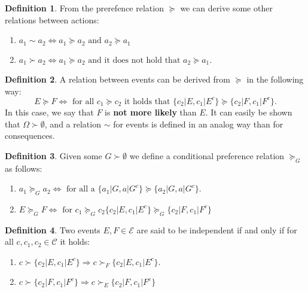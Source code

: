\documentclass[english,letterpaper,12pt,final]{article}
\theoremstyle{definition}
\newtheorem{defi}{Definition}[section]
\begin{document}
	\begin{defi}
	From the prerefence relation $\succeq$ we can derive some other relations between actions:
	\begin{enumerate}[label=(\roman*)]
	\item $a_1 \sim a_2 \Leftrightarrow a_1 \succeq a_2 \textrm{ and } a_2 \succeq a_1$
	\item $a_1 \succ a_2 \Leftrightarrow a_1 \succeq a_2 \textrm{ and it does not hold that } a_2 \succeq a_1$.
	\end{enumerate}
	\end{defi}
	\begin{defi}{\label{more_likely}}
	A relation between events can be derived from $\succeq$ in the following way:
	\[E \succeq F \Leftrightarrow \textrm{ for all } c_1 \succeq c_2 \textrm{ it holds that } \{ c_2 | E, c_1 | E^c \} \succeq \{ c_2 | F, c_1 | F^c \}. \]
	In this case, we say that $F$ is \textbf{not more likely} than $E$. It can easily be shown that $\Omega \succ \emptyset$, and a relation $\sim$ for events is defined in an analog way than for consequences.
	\end{defi}
	\begin{defi}{\label{cond_pref}}
	Given some $G \succ \emptyset$ we define a conditional preference relation $\succeq_G$ as follows:
	\begin{enumerate}[label=(\roman*)]
	\item $a_1 \succeq_G a_2 \Leftrightarrow \textrm{ for all a } \{ a_1 | G, a | G^c \} \succeq \{ a_2 | G, a | G^c \}$.
	\item $E \succeq_G F \Leftrightarrow \textrm{ for } c_1 \succeq_G c_2 \{ c_2 | E , c_1 | E^c \} \succeq_G \{c_2 | F , c_1  | F^c \}$ 
	\end{enumerate}
	\end{defi}
	\begin{defi}
	Two events $E,F \in \mathcal{E}$ are said to be independent if and only if for all $c, c_1, c_2 \in \mathcal{C}$ it holds:
	\begin{enumerate}[label=(\roman*)]
	\item $c \succ \{ c_2 | E, c_1 | E^c \} \Rightarrow c \succ_F \{ c_2 | E, c_1 | E^c \}	$.
	\item $c \succ \{ c_2 | F, c_1 | F^c \} \Rightarrow c \succ_E \{ c_2 | F, c_1 | F^c \}	$
	\end{enumerate}
	\end{defi}
\end{document}

